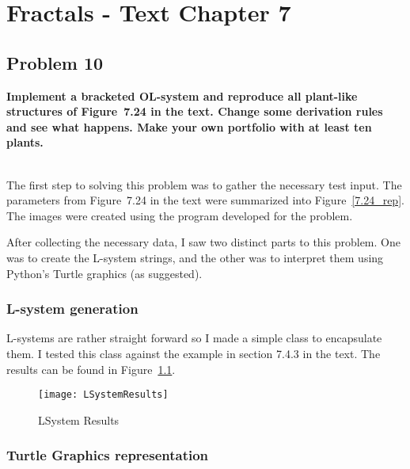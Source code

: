 
\chapter{Fractals - Text Chapter 7}

\section{Problem 10}
\textbf{
Implement a bracketed OL-system and reproduce all plant-like structures of Figure~7.24 in the text. Change some derivation rules and see what happens. Make your own portfolio with at least ten plants.
}

\hfill \\

The first step to solving this problem was to gather the necessary test input. The parameters from Figure~7.24 in the text were summarized into Figure~\ref{7.24_rep}. The images were created using the program developed for the problem.

After collecting the necessary data, I saw two distinct parts to this problem. One was to create the L-system strings, and the other was to interpret them using Python's Turtle graphics (as suggested).

\subsection{L-system generation}
L-systems are rather straight forward so I made a simple class to encapsulate them. I tested this class against the example in section 7.4.3 in the text. The results can be found in Figure~\ref{lsystem_results}.

\begin{figure}
\centering
\texttt{[image: LSystemResults]}
\caption{LSystem Results}
\label{lsystem_results}
\end{figure}


\subsection{Turtle Graphics representation}

